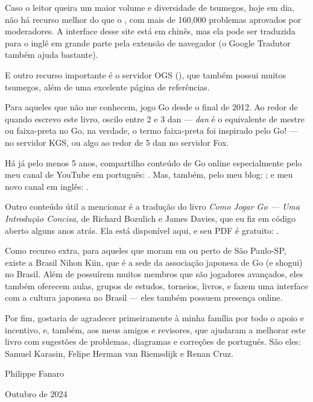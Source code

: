 Caso o leitor queira um maior volume e diversidade de tsumegos, hoje em dia, não há recurso melhor do que o , com mais de 160,000 problemas aprovados por moderadores. A interface desse site está em chinês, mas ela pode ser traduzida para o inglê em grande parte pela extensão de navegador  (o Google Tradutor também ajuda bastante).

E outro recurso importante é o servidor OGS (), que também possui muitos tsumegos, além de uma excelente página de referências.

\bigskip
\bigskip

Para aqueles que não me conhecem, jogo Go desde o final de 2012. Ao redor de quando escrevo este livro, oscilo entre 2 e 3 dan --- \emph{dan} é o equivalente de mestre ou faixa-preta no Go, na verdade, o termo faixa-preta foi inspirado pelo Go! --- no servidor KGS, ou algo ao redor de 5 dan no servidor Fox.

Há já pelo menos 5 anos, compartilho conteúdo de Go online especialmente pelo meu canal de YouTube em português: . Mas, também, pelo meu blog: ; e meu novo canal em inglês: .

Outro conteúdo útil a mencionar é a tradução do livro \emph{Como Jogar Go --- Uma Introdução Concisa}, de Richard Bozulich e James Davies, que eu fiz em código aberto alguns anos atrás. Ela está disponível aqui, e seu PDF é gratuito: .

Como recurso extra, para aqueles que moram em ou perto de São Paulo-SP, existe a Brasil Nihon Kiin, que é a sede da associação japonesa de Go (e shogui) no Brasil. Além de possuírem muitos membros que são jogadores avançados, eles também oferecem aulas, grupos de estudos, torneios, livros, e fazem uma interface com a cultura japonesa no Brasil --- eles também possuem presença online.

Por fim, gostaria de agradecer primeiramente à minha família por todo o apoio e incentivo, e, também, aos meus amigos e revisores, que ajudaram a melhorar este livro com sugestões de problemas, diagramas e correções de português. São eles: Samuel Karasin, Felipe Herman van Riemsdijk e Renan Cruz.

\bigskip
\smallskip
\smallskip
\smallskip

\hspace*{\fill} Philippe Fanaro \hspace{0.115cm}

\hspace*{\fill} Outubro de 2024 \hspace{0.05cm}

\blankpage
\blankpage